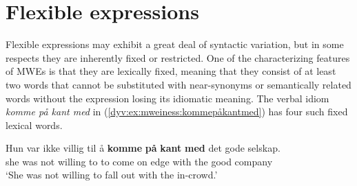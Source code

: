 \documentclass[output=paper]{langsci/langscibook}
\begin{document}

%
%
%
%
%
%
%


\section{Flexible expressions}\label{dyv:sec:mweiness:flexexp}
Flexible expressions may exhibit a great deal of syntactic variation, but in some respects they are inherently fixed or restricted.
One of the characterizing features of MWEs is that they are lexically fixed, meaning that they consist of at least two words that cannot be substituted with near-synonyms or semantically related words without the expression losing its idiomatic meaning.
The verbal idiom \emph{komme på kant med} in (\ref{dyv:ex:mweiness:kommepåkantmed}) has four such fixed lexical words.


\ea\label{dyv:ex:mweiness:kommepåkantmed}
\gll Hun var ikke villig til å \textbf{komme} \textbf{på} \textbf{kant} \textbf{med} det gode selskap. \\
     she was not willing to to come on edge with the good company \\
\glt `She was not willing to fall out with the in-crowd.’
\z
\end{document}
